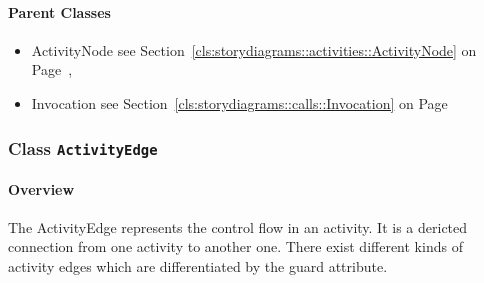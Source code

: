 	



\paragraph{Parent Classes}
\begin{itemize}
\item ActivityNode see Section~\ref{cls:storydiagrams::activities::ActivityNode} on Page~\pageref{cls:storydiagrams::activities::ActivityNode}, \item Invocation see Section~\ref{cls:storydiagrams::calls::Invocation} on Page~\pageref{cls:storydiagrams::calls::Invocation}\end{itemize}
\subsubsection{\Large{Class \bfseries \texttt{ActivityEdge}\normalfont}}
\label{cls:storydiagrams::activities::ActivityEdge} 
\paragraph{Overview}

	
			
The ActivityEdge represents the control flow in an activity. It is a dericted connection from one activity to another one. There exist different kinds of activity edges which are differentiated by the guard attribute.	
		
	


